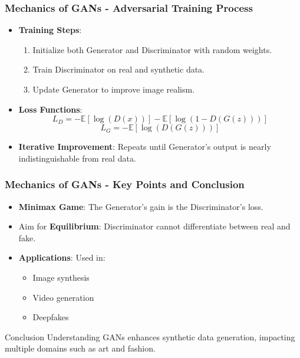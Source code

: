 \documentclass[aspectratio=169]{beamer}
\begin{document}
\begin{frame}[fragile]
    \frametitle{Mechanics of GANs - Adversarial Training Process}
    \begin{itemize}
        \item \textbf{Training Steps}:
        \begin{enumerate}
            \item Initialize both Generator and Discriminator with random weights.
            \item Train Discriminator on real and synthetic data.
            \item Update Generator to improve image realism.
        \end{enumerate}
        
        \item \textbf{Loss Functions}:
        \begin{equation}
        L_D = - \mathbb{E}[\log(D(x))] - \mathbb{E}[\log(1-D(G(z)))]
        \end{equation}
        \begin{equation}
        L_G = - \mathbb{E}[\log(D(G(z)))]
        \end{equation}

        \item \textbf{Iterative Improvement}: Repeats until Generator's output is nearly indistinguishable from real data.
    \end{itemize}
\end{frame}

\begin{frame}[fragile]
    \frametitle{Mechanics of GANs - Key Points and Conclusion}
    \begin{itemize}
        \item \textbf{Minimax Game}: The Generator's gain is the Discriminator's loss.
        \item Aim for \textbf{Equilibrium}: Discriminator cannot differentiate between real and fake.
        \item \textbf{Applications}: Used in:
        \begin{itemize}
            \item Image synthesis
            \item Video generation
            \item Deepfakes
        \end{itemize}
    \end{itemize}

    \begin{block}{Conclusion}
        Understanding GANs enhances synthetic data generation, impacting multiple domains such as art and fashion.
    \end{block}
\end{frame}
\end{document}
